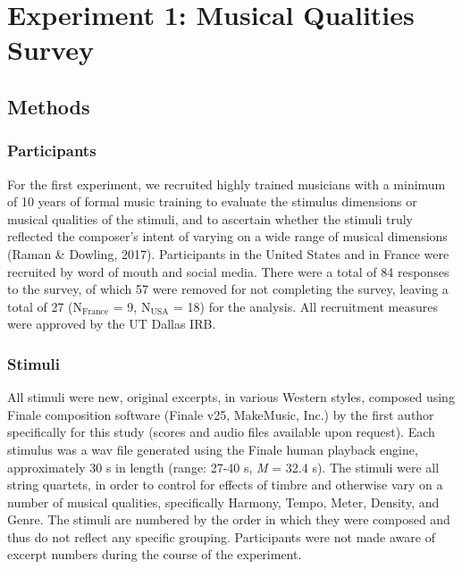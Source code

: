 \documentclass[
  english,
  man,floatsintext]{apa6}
\begin{document}
\hypertarget{experiment-1-musical-qualities-survey}{%
\section{Experiment 1: Musical Qualities Survey}\label{experiment-1-musical-qualities-survey}}

\hypertarget{methods}{%
\subsection{Methods}\label{methods}}

\hypertarget{participants}{%
\subsubsection{Participants}\label{participants}}

For the first experiment, we recruited highly trained musicians with a minimum of 10 years of formal music training to evaluate the stimulus dimensions or musical qualities of the stimuli, and to ascertain whether the stimuli truly reflected the composer's intent of varying on a wide range of musical dimensions (Raman \& Dowling, 2017). Participants in the United States and in France were recruited by word of mouth and social media. There were a total of 84 responses to the survey, of which 57 were removed for not completing the survey, leaving a total of 27 (N\(\mathrm{_{France}}\) = 9, N\(\mathrm{_{USA}}\) = 18) for the analysis. All recruitment measures were approved by the UT Dallas IRB.

\hypertarget{stimuli}{%
\subsubsection{Stimuli}\label{stimuli}}

All stimuli were new, original excerpts, in various Western styles, composed using Finale composition software (Finale v25, MakeMusic, Inc.) by the first author specifically for this study (scores and audio files available upon request). Each stimulus was a wav file generated using the Finale human playback engine, approximately 30 s in length (range: 27-40 s, \emph{M} = 32.4 s). The stimuli were all string quartets, in order to control for effects of timbre and otherwise vary on a number of musical qualities, specifically Harmony, Tempo, Meter, Density, and Genre. The stimuli are numbered by the order in which they were composed and thus do not reflect any specific grouping. Participants were not made aware of excerpt numbers during the course of the experiment.
\end{document}
